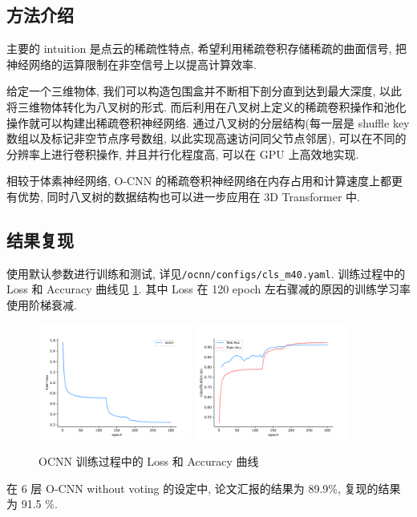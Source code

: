 \documentclass[11pt]{article}
\newcommand\1{\mathds{1}}
\begin{document}
\subsection{方法介绍}
主要的 intuition 是点云的稀疏性特点, 希望利用稀疏卷积存储稀疏的曲面信号, 把神经网络的运算限制在非空信号上以提高计算效率.

给定一个三维物体, 我们可以构造包围盒并不断相下剖分直到达到最大深度, 以此将三维物体转化为八叉树的形式. 而后利用在八叉树上定义的稀疏卷积操作和池化操作就可以构建出稀疏卷积神经网络.
通过八叉树的分层结构(每一层是 shuffle key 数组以及标记非空节点序号数组, 以此实现高速访问同父节点邻居), 可以在不同的分辨率上进行卷积操作, 并且并行化程度高, 可以在 GPU 上高效地实现.

相较于体素神经网络, O-CNN 的稀疏卷积神经网络在内存占用和计算速度上都更有优势, 同时八叉树的数据结构也可以进一步应用在 3D Transformer 中. 
\subsection{结果复现}
使用默认参数进行训练和测试, 详见\texttt{/ocnn/configs/cls\_m40.yaml}. 训练过程中的 Loss 和 Accuracy 曲线见 \cref{fig:ocnn_loss_acc}.
其中 Loss 在 120 epoch 左右骤减的原因的训练学习率使用阶梯衰减. 
\begin{figure}[htbp]
    \centering
    \includegraphics[width = 0.45\textwidth]{./logs/figures/ocnn_loss.pdf}
    \includegraphics[width = 0.45\textwidth]{./logs/figures/ocnn_acc.pdf}
    \caption{OCNN 训练过程中的 Loss 和 Accuracy 曲线}
    \label{fig:ocnn_loss_acc}
\end{figure}

在 6 层 O-CNN without voting 的设定中, 论文汇报的结果为 89.9\%, 复现的结果为 91.5 \%.
\end{document}
